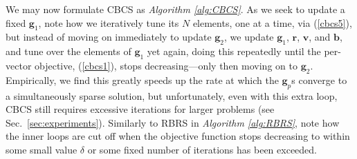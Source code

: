 \documentclass[final]{siamltex}
\newcommand{\la}[1]{\mbox{$\mathbf{#1}$}}  \newcommand{\sst}[1]{\mbox{\scriptsize{#1}}}
\begin{document}
    We may now formulate CBCS as {\em{Algorithm \ref{alg:CBCS}}}.  As
    we seek to update a fixed $\la{g}_1$, note how we iteratively tune
    its $N$ elements, one at a time, via (\ref{cbcs5}), but instead of
    moving on immediately to update $\la{g}_2$, we update $\la{g}_1$,
    $\la{r}$, $\la{v}$, and $\la{b}$, and tune over the elements of
    $\la{g}_1$ yet again, doing this repeatedly until the per-vector
    objective, (\ref{cbcs1}), stops decreasing---only then moving on
    to $\la{g}_2$.  Empirically, we find this greatly speeds up the
    rate at which the $\la{g}_p$s converge to a simultaneously sparse
    solution, but unfortunately, even with this extra loop, CBCS still
    requires excessive iterations for larger problems (see
    Sec.~\ref{sec:experiments}).  Similarly to RBRS in {\em{Algorithm
    \ref{alg:RBRS}}}, note how the inner loops are cut off when the
    objective function stops decreasing to within some small value
    $\delta$ or some fixed number of iterations has been exceeded.
\end{document}
